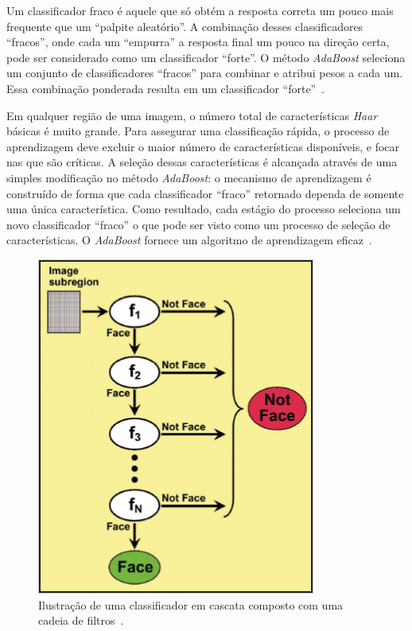 	Um classificador fraco é aquele que só obtém a resposta correta um pouco mais
	frequente que um ``palpite aleatório''. A combinação desses classificadores
	``fracos'', onde cada um ``empurra'' a resposta final um pouco na direção certa,
	pode ser considerado como um classificador ``forte''. O método \textit{AdaBoost}
	seleciona um conjunto de classificadores ``fracos'' para combinar e atribui
	pesos a cada um. Essa combinação ponderada resulta em um classificador
	``forte''~\cite{servodetection}.
	
	Em qualquer região de uma imagem, o número total de características
	\textit{Haar} básicas é muito grande. Para assegurar uma classificação rápida, o
	processo de aprendizagem deve excluir o maior número de características
	disponíveis, e focar nas que são críticas. A seleção dessas características é
	alcançada através de uma simples modificação no método \textit{AdaBoost}: o
	mecanismo de aprendizagem é construído de forma que cada classificador ``fraco''
	retornado dependa de somente uma única característica. Como resultado, cada
	estágio do processo seleciona um novo classificador ``fraco'' o que pode ser
	visto como um processo de seleção de características. O	\textit{AdaBoost}
	fornece um algoritmo de aprendizagem eficaz~\cite{violajones}.

	\begin{figure}[H]
		\begin{center}
			\includegraphics[scale=5.0]{figuras/2.FundamentacaoTeorica/filterchain.png}
		\end{center}
		\caption{Ilustração de uma classificador em cascata composto com uma cadeia de filtros~\cite{servodetection}.}
		\label{filterchain}
	\end{figure}


